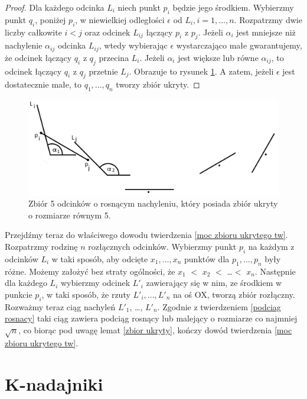 \documentclass[brudnopis]{xmgr}
\theoremstyle{definition}
\begin{document}
\begin{proof}
	Dla każdego odcinka $L_i$ niech punkt $p_i$ będzie jego środkiem. Wybierzmy punkt $q_i$, poniżej $p_i$, w niewielkiej odległości $\epsilon$ od $L_i, i = 1,\ldots,n$. Rozpatrzmy dwie liczby całkowite $i < j$ oraz odcinek $L_{ij}$ łączący $p_i$ z $p_j$. Jeżeli $\alpha_i$ jest mniejsze niż nachylenie $\alpha_{ij}$ odcinka $L_{ij}$, wtedy wybierając $\epsilon$ wystarczająco małe gwarantujemy, że odcinek łączący $q_i$ z $q_j$ przecina $L_i$. Jeżeli $\alpha_i$ jest większe lub równe $\alpha_{ij}$, to odcinek łączący $q_i$ z $q_j$ przetnie $L_j$. Obrazuje to rysunek \ref{fig:5 zbior ukryty}. A zatem, jeżeli $\epsilon$ jest dostatecznie małe, to  $q_1, \ldots, q_n$ tworzy zbiór ukryty. 
\end{proof}
\begin{figure}[ht!]
  \centering
   \includegraphics{rysunki/5_odcinkow_zbior_ukryty.png}
   \caption{Zbiór 5 odcinków o rosnącym nachyleniu, który posiada zbiór ukryty o rozmiarze równym 5.}
   \label{fig:5 zbior ukryty}
\end{figure}
\indent Przejdźmy teraz do właściwego dowodu twierdzenia \ref{moc zbioru ukrytego tw}. Rozpatrzmy rodzinę $n$ rozłącznych odcinków. Wybierzmy punkt $p_i$ na każdym z odcinków $L_i$ w taki sposób, aby odcięte $x_1,\ldots, x_n$  punktów dla $p_1,\ldots,p_n$ były różne. Możemy założyć bez straty ogólności, że $x_1$ $<$ $x_2$ $<$ \ldots $<$ $x_n$. Następnie dla każdego $L_i$ wybierzmy odcinek $L'_i$ zawierający się w nim, ze środkiem w punkcie $p_i$, w taki sposób, że rzuty $L'_i,\ldots,L'_n$ na oś OX, tworzą zbiór rozłączny. Rozważmy teraz ciąg nachyleń $L'_1$, \ldots, $L'_n$. Zgodnie z twierdzeniem \ref{podciag rosnacy} taki ciąg zawiera podciąg rosnący lub malejący o rozmiarze co najmniej $\sqrt{n}$, co biorąc pod uwagę lemat \ref{zbior ukryty}, kończy dowód twierdzenia \ref{moc zbioru ukrytego tw}.

\chapter{K-nadajniki}
\end{document}
